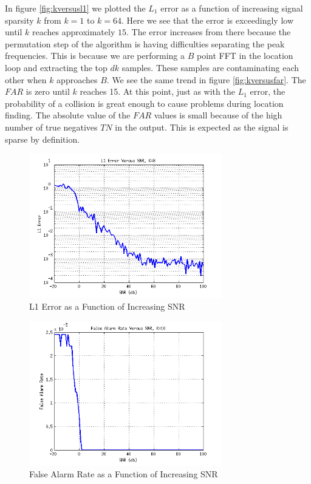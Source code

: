 \documentclass[journal]{IEEEtran}
\begin{document}
\par In figure \ref{fig:kversusl1} we plotted the \(L_1\) error as a function of increasing signal sparsity \(k\) from \(k=1\) to \(k=64\). Here we see that the error is exceedingly low until \(k\) reaches approximately \(15\). The error increases from there because the permutation step of the algorithm is having difficulties separating the peak frequencies. This is because we are performing a \(B\) point FFT in the location loop and extracting the top \(dk\) samples. These samples are contaminating each other when \(k\) approaches \(B\). We see the same trend in figure \ref{fig:kversusfar}. The \(FAR\) is zero until \(k\) reaches 15. At this point, just as with the \(L_1\) error, the probability of a collision is great enough to cause problems during location finding. The absolute value of the \(FAR\) values is small because of the high number of true negatives \(TN\) in the output. This is expected as the signal is sparse by definition.

\begin{figure}[h]
\centering
\includegraphics[width=3.3in]{../images/snrversusl1.png}
\caption{L1 Error as a Function of Increasing SNR}
\label{fig:snrversusl1}
\end{figure}

\begin{figure}[h]
\centering
\includegraphics[width=3.3in]{../images/snrversusfar.png}
\caption{False Alarm Rate as a Function of Increasing SNR}
\label{fig:snrversusfar}
\end{figure}
\end{document}
